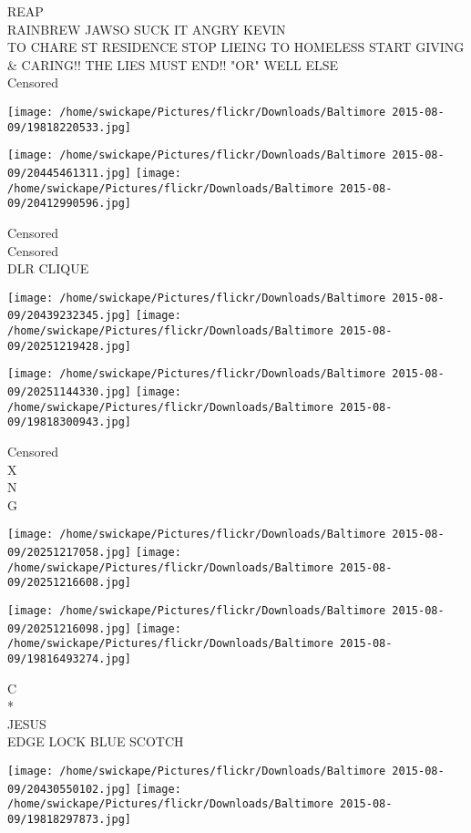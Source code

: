 \documentclass[10pt,letterpaper]{article}
\begin{document}
REAP\\
RAINBREW JAWSO SUCK IT ANGRY KEVIN\\
TO CHARE ST RESIDENCE STOP LIEING TO HOMELESS START GIVING \& CARING!! THE LIES MUST END!! "OR" WELL ELSE\\
Censored
\pagebreak

\texttt{[image: /home/swickape/Pictures/flickr/Downloads/Baltimore 2015-08-09/19818220533.jpg]}

\vspace{0.25in}
\texttt{[image: /home/swickape/Pictures/flickr/Downloads/Baltimore 2015-08-09/20445461311.jpg]}
\texttt{[image: /home/swickape/Pictures/flickr/Downloads/Baltimore 2015-08-09/20412990596.jpg]}

Censored\\
Censored\\
DLR CLIQUE
\pagebreak

\texttt{[image: /home/swickape/Pictures/flickr/Downloads/Baltimore 2015-08-09/20439232345.jpg]}
\texttt{[image: /home/swickape/Pictures/flickr/Downloads/Baltimore 2015-08-09/20251219428.jpg]}

\texttt{[image: /home/swickape/Pictures/flickr/Downloads/Baltimore 2015-08-09/20251144330.jpg]}
\texttt{[image: /home/swickape/Pictures/flickr/Downloads/Baltimore 2015-08-09/19818300943.jpg]}

Censored\\
X\\
N\\
G
\pagebreak

\texttt{[image: /home/swickape/Pictures/flickr/Downloads/Baltimore 2015-08-09/20251217058.jpg]}
\texttt{[image: /home/swickape/Pictures/flickr/Downloads/Baltimore 2015-08-09/20251216608.jpg]}

\texttt{[image: /home/swickape/Pictures/flickr/Downloads/Baltimore 2015-08-09/20251216098.jpg]}
\texttt{[image: /home/swickape/Pictures/flickr/Downloads/Baltimore 2015-08-09/19816493274.jpg]}

C\\
*\\
JESUS\\
EDGE LOCK BLUE SCOTCH
\pagebreak

\texttt{[image: /home/swickape/Pictures/flickr/Downloads/Baltimore 2015-08-09/20430550102.jpg]}
\texttt{[image: /home/swickape/Pictures/flickr/Downloads/Baltimore 2015-08-09/19818297873.jpg]}
\end{document}
